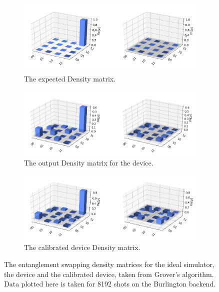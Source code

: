 \begin{figure}[h]
	\begin{subfigure}{.5\textwidth}
		\centering
		\includegraphics[width=.8\linewidth]{images/results/grov_density_sim.png}
		\caption{The expected Density matrix.}
		\label{fig:grov_density_sim}
	\end{subfigure} \newline
	\begin{subfigure}{.5\textwidth}
		\centering
		\includegraphics[width=.8\linewidth]{images/results/grov_density_dev.png}
		\caption{The output Density matrix for the device.}
		\label{fig:grov_density_dev}
	\end{subfigure} \newline
	\begin{subfigure}{.5\textwidth}
		\centering
		\includegraphics[width=.8\linewidth]{images/results/grov_density_cal.png}
		\caption{The calibrated device Density matrix.}
		\label{fig:grov_density_cal}
	\end{subfigure}
	\caption{The entanglement swapping density matrices for the ideal simulator,
		the device and the calibrated device, taken from Grover's algorithm. Data plotted here is taken for 8192 shots
		on the Burlington backend. }
	\label{fig:grov_density}
\end{figure}

